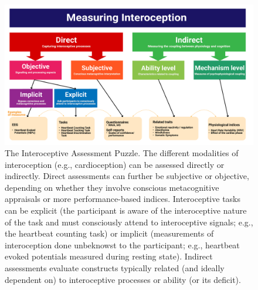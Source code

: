 \documentclass[
  jou,
  floatsintext,
  longtable,
  nolmodern,
  notxfonts,
  notimes,
  colorlinks=true,linkcolor=blue,citecolor=blue,urlcolor=blue]{apa7}
\begin{document}
\begin{figure}[!htbp]

{\caption{{The Interoceptive Assessment Puzzle. The different modalities
of interoception (e.g., cardioception) can be assessed directly or
indirectly. Direct assessments can further be subjective or objective,
depending on whether they involve conscious metacognitive appraisals or
more performance-based indices. Interoceptive tasks can be explicit (the
participant is aware of the interoceptive nature of the task and must
consciously attend to interoceptive signals; e.g., the heartbeat
counting task) or implicit (measurements of interoception done
unbeknowst to the participant; e.g., heartbeat evoked potentials
measured during resting state). Indirect assessments evaluate constructs
typically related (and ideally dependent on) to interoceptive processes
or ability (or its deficit).}{\label{fig-measures}}}}

\includegraphics[width=1\linewidth,height=\textheight,keepaspectratio]{figures/MeasuringInteroception.png}

\end{figure}
\end{document}
